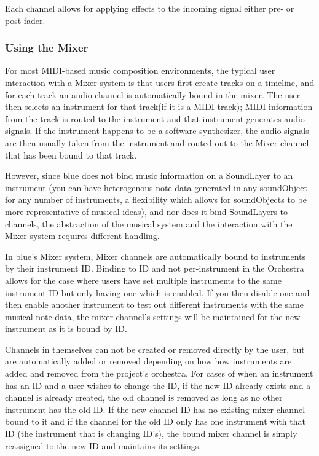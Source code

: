 Each channel allows for applying effects to the incoming signal either
pre- or post-fader.

\subsubsection{Using the Mixer}

For most MIDI-based music composition environments, the typical user
interaction with a Mixer system is that users first create tracks on a
timeline, and for each track an audio channel is automatically bound in
the mixer. The user then selects an instrument for that track(if it is a
MIDI track); MIDI information from the track is routed to the instrument
and that instrument generates audio signals. If the instrument happens
to be a software synthesizer, the audio signals are then usually taken
from the instrument and routed out to the Mixer channel that has been
bound to that track.

However, since blue does not bind music information on a SoundLayer to
an instrument (you can have heterogenous note data generated in any
soundObject for any number of instruments, a flexibility which allows
for soundObjects to be more representative of musical ideas), and nor
does it bind SoundLayers to channels, the abstraction of the musical
system and the interaction with the Mixer system requires different
handling.

In blue's Mixer system, Mixer channels are automatically bound to
instruments by their instrument ID. Binding to ID and not per-instrument
in the Orchestra allows for the case where users have set multiple
instruments to the same instrument ID but only having one which is
enabled. If you then disable one and then enable another instrument to
test out different instruments with the same musical note data, the
mixer channel's settings will be maintained for the new instrument as it
is bound by ID.

Channels in themselves can not be created or removed directly by the
user, but are automatically added or removed depending on how how
instruments are added and removed from the project's orchestra. For
cases of when an instrument has an ID and a user wishes to change the
ID, if the new ID already exists and a channel is already created, the
old channel is removed as long as no other instrument has the old ID. If
the new channel ID has no existing mixer channel bound to it and if the
channel for the old ID only has one instrument with that ID (the
instrument that is changing ID's), the bound mixer channel is simply
reassigned to the new ID and maintains its settings.


